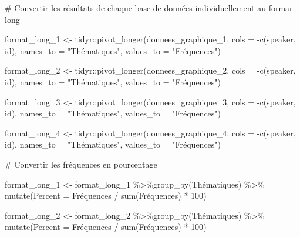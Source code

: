 \documentclass[
  letterpaper,
  DIV=11,
  numbers=noendperiod]{scrartcl}
\newenvironment{Shaded}{\begin{snugshade}}{\end{snugshade}}
\newcommand{\AttributeTok}[1]{\textcolor[rgb]{0.40,0.45,0.13}{#1}}
\newcommand{\CommentTok}[1]{\textcolor[rgb]{0.37,0.37,0.37}{#1}}
\newcommand{\DecValTok}[1]{\textcolor[rgb]{0.68,0.00,0.00}{#1}}
\newcommand{\FunctionTok}[1]{\textcolor[rgb]{0.28,0.35,0.67}{#1}}
\newcommand{\NormalTok}[1]{\textcolor[rgb]{0.00,0.23,0.31}{#1}}
\newcommand{\OtherTok}[1]{\textcolor[rgb]{0.00,0.23,0.31}{#1}}
\newcommand{\SpecialCharTok}[1]{\textcolor[rgb]{0.37,0.37,0.37}{#1}}
\newcommand{\StringTok}[1]{\textcolor[rgb]{0.13,0.47,0.30}{#1}}
\begin{document}
\begin{Shaded}
\begin{Highlighting}[]
\CommentTok{\# Convertir les résultats de chaque base de données individuellement au formar long}

\NormalTok{format\_long\_1 }\OtherTok{\textless{}{-}}\NormalTok{ tidyr}\SpecialCharTok{::}\FunctionTok{pivot\_longer}\NormalTok{(donnees\_graphique\_1, }\AttributeTok{cols =} \SpecialCharTok{{-}}\FunctionTok{c}\NormalTok{(speaker, id), }\AttributeTok{names\_to =} \StringTok{"Thématiques"}\NormalTok{, }\AttributeTok{values\_to =} \StringTok{"Fréquences"}\NormalTok{)}

\NormalTok{format\_long\_2 }\OtherTok{\textless{}{-}}\NormalTok{ tidyr}\SpecialCharTok{::}\FunctionTok{pivot\_longer}\NormalTok{(donnees\_graphique\_2, }\AttributeTok{cols =} \SpecialCharTok{{-}}\FunctionTok{c}\NormalTok{(speaker, id), }\AttributeTok{names\_to =} \StringTok{"Thématiques"}\NormalTok{, }\AttributeTok{values\_to =} \StringTok{"Fréquences"}\NormalTok{)}

\NormalTok{format\_long\_3 }\OtherTok{\textless{}{-}}\NormalTok{ tidyr}\SpecialCharTok{::}\FunctionTok{pivot\_longer}\NormalTok{(donnees\_graphique\_3, }\AttributeTok{cols =} \SpecialCharTok{{-}}\FunctionTok{c}\NormalTok{(speaker, id), }\AttributeTok{names\_to =} \StringTok{"Thématiques"}\NormalTok{, }\AttributeTok{values\_to =} \StringTok{"Fréquences"}\NormalTok{)}

\NormalTok{format\_long\_4 }\OtherTok{\textless{}{-}}\NormalTok{ tidyr}\SpecialCharTok{::}\FunctionTok{pivot\_longer}\NormalTok{(donnees\_graphique\_4, }\AttributeTok{cols =} \SpecialCharTok{{-}}\FunctionTok{c}\NormalTok{(speaker, id), }\AttributeTok{names\_to =} \StringTok{"Thématiques"}\NormalTok{, }\AttributeTok{values\_to =} \StringTok{"Fréquences"}\NormalTok{)}

\CommentTok{\# Convertir les fréquences en pourcentage}

\NormalTok{format\_long\_1 }\OtherTok{\textless{}{-}}\NormalTok{ format\_long\_1 }\SpecialCharTok{\%\textgreater{}\%}\FunctionTok{group\_by}\NormalTok{(Thématiques) }\SpecialCharTok{\%\textgreater{}\%} \FunctionTok{mutate}\NormalTok{(}\AttributeTok{Percent =}\NormalTok{ Fréquences }\SpecialCharTok{/} \FunctionTok{sum}\NormalTok{(Fréquences) }\SpecialCharTok{*} \DecValTok{100}\NormalTok{)}

\NormalTok{format\_long\_2 }\OtherTok{\textless{}{-}}\NormalTok{ format\_long\_2 }\SpecialCharTok{\%\textgreater{}\%}\FunctionTok{group\_by}\NormalTok{(Thématiques) }\SpecialCharTok{\%\textgreater{}\%} \FunctionTok{mutate}\NormalTok{(}\AttributeTok{Percent =}\NormalTok{ Fréquences }\SpecialCharTok{/} \FunctionTok{sum}\NormalTok{(Fréquences) }\SpecialCharTok{*} \DecValTok{100}\NormalTok{)}


\end{Highlighting}
\end{Shaded}
\end{document}

